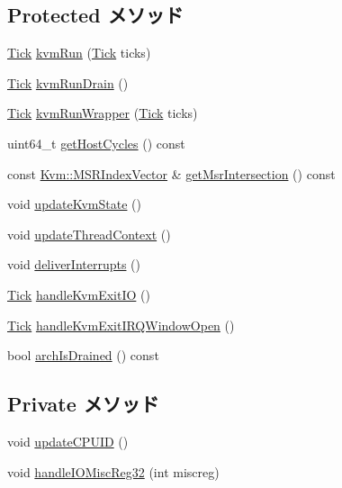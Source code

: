 \subsection*{Protected メソッド}
\begin{DoxyCompactItemize}
\item 
\hyperlink{base_2types_8hh_a5c8ed81b7d238c9083e1037ba6d61643}{Tick} \hyperlink{classX86KvmCPU_aed3dbd0c0bf26d82ee56367a3f350506}{kvmRun} (\hyperlink{base_2types_8hh_a5c8ed81b7d238c9083e1037ba6d61643}{Tick} ticks)
\item 
\hyperlink{base_2types_8hh_a5c8ed81b7d238c9083e1037ba6d61643}{Tick} \hyperlink{classX86KvmCPU_a405afc17ad0dee3b816012ce909b2b6f}{kvmRunDrain} ()
\item 
\hyperlink{base_2types_8hh_a5c8ed81b7d238c9083e1037ba6d61643}{Tick} \hyperlink{classX86KvmCPU_afae1f96b6b1a482f400cd925b8709325}{kvmRunWrapper} (\hyperlink{base_2types_8hh_a5c8ed81b7d238c9083e1037ba6d61643}{Tick} ticks)
\item 
uint64\_\-t \hyperlink{classX86KvmCPU_abcad2a22057ba48360b17b978f694b48}{getHostCycles} () const 
\item 
const \hyperlink{classstd_1_1vector}{Kvm::MSRIndexVector} \& \hyperlink{classX86KvmCPU_abab51da6ec6a0f14d2dde6b0857b7b34}{getMsrIntersection} () const 
\item 
void \hyperlink{classX86KvmCPU_a93c6e8c82dfb63c7039f0cbf064fae5d}{updateKvmState} ()
\item 
void \hyperlink{classX86KvmCPU_adbd5e38eae7c8c3021f2c4f430b399fd}{updateThreadContext} ()
\item 
void \hyperlink{classX86KvmCPU_a7f9a05aa2521efe15d995cad6a739aa5}{deliverInterrupts} ()
\item 
\hyperlink{base_2types_8hh_a5c8ed81b7d238c9083e1037ba6d61643}{Tick} \hyperlink{classX86KvmCPU_a404fbd80d6676724d026a932b2258dc7}{handleKvmExitIO} ()
\item 
\hyperlink{base_2types_8hh_a5c8ed81b7d238c9083e1037ba6d61643}{Tick} \hyperlink{classX86KvmCPU_a405e34c9d079e8823ac2a1ca0e816a47}{handleKvmExitIRQWindowOpen} ()
\item 
bool \hyperlink{classX86KvmCPU_a1d97c7e0665d576bb463335078bb02ec}{archIsDrained} () const 
\end{DoxyCompactItemize}
\subsection*{Private メソッド}
\begin{DoxyCompactItemize}
\item 
void \hyperlink{classX86KvmCPU_adcec996536ccdb020b08a11d61a47d44}{updateCPUID} ()
\item 
void \hyperlink{classX86KvmCPU_a58452f4681b53990ff7470d1884ac13c}{handleIOMiscReg32} (int miscreg)
\end{DoxyCompactItemize}
